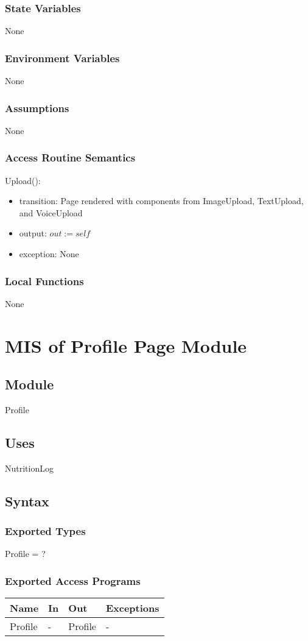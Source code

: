 \documentclass[12pt, titlepage]{article}
\begin{document}
\subsubsection{State Variables}
None
\subsubsection{Environment Variables}
None
\subsubsection{Assumptions}
None
\subsubsection{Access Routine Semantics}
\noindent Upload():
\begin{itemize}
	\item transition: Page rendered with components from ImageUpload, 
	TextUpload, and VoiceUpload
	\item output: $out := self$
	\item exception: None
\end{itemize}
\subsubsection{Local Functions}
None

\newpage

\section{MIS of Profile Page Module} \label{ProfilePage}
\subsection{Module}
Profile
\subsection{Uses}
NutritionLog
\subsection{Syntax}
\subsubsection{Exported Types}
Profile = ?
\subsubsection{Exported Access Programs}
\begin{center}
	\begin{tabular}{p{2cm} p{4cm} p{4cm} p{2cm}}
		\hline
		\textbf{Name} & \textbf{In} & \textbf{Out} & \textbf{Exceptions} \\
		\hline
		Profile & - & Profile & - \\
		\hline
	\end{tabular}
\end{center}
\end{document}

